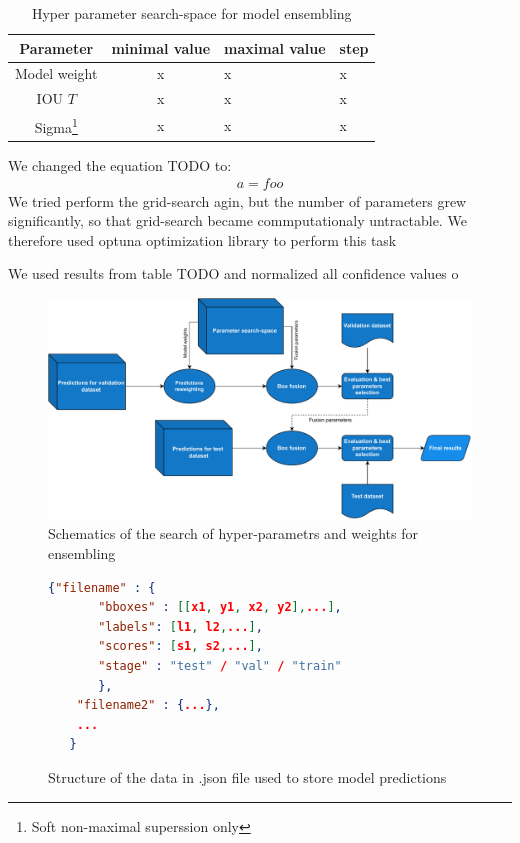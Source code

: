 \begin{table}
   \centering
   \begin{tabular}{c|c}
        Parameter & minimal value & maximal value & step \\ \hline
        Model weight &  x & x & x \\ \hline
        IOU $T$ & x & x & x \\ \hline
        Sigma\footnote{Soft non-maximal superssion only } & x & x & x \\ \hline
   \end{tabular}
   \caption{Hyper parameter search-space for model ensembling}
   \label{tab:ensembling_search_space}
\end{table}

We changed the equation TODO to:
\begin{align}
    a = foo
\end{align}
We tried perform the grid-search agin, but the number of parameters grew significantly, so that grid-search became commputationaly untractable. We therefore used optuna optimization library to perform this task

We used results from table TODO and normalized all confidence values o
\begin{figure}
    \centering
    \includegraphics[width=\linewidth]{images/ensemble_search_diag.drawio.pdf}
    \caption{Schematics of the search of hyper-parametrs and weights for ensembling}
    \label{fig:diag:ense_search}
\end{figure}

\begin{figure}
    \centering
    \begin{lstlisting}[language=json, numbers=none]
   {"filename" : {
       "bboxes" : [[x1, y1, x2, y2],...],
       "labels": [l1, l2,...],
       "scores": [s1, s2,...],
       "stage" : "test" / "val" / "train"
       },
    "filename2" : {...},
    ...
   }
\end{lstlisting}
    \caption{Structure of the data in .json file used to store model predictions}
    \label{fig:predictions_json}
\end{figure}